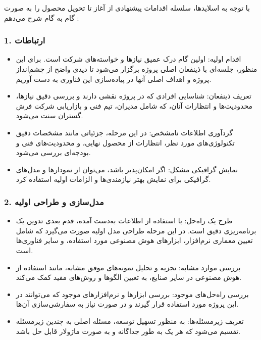 با توجه به اسلایدها، 
سلسله اقدامات پیشنهادی از آغاز تا تحویل محصول را به صورت گام به گام شرح می‌دهم
:


\subsubsection*{1. ارتباطات}
\begin{itemize}
    \item
    اقدام اولیه: اولین گام درک عمیق نیازها و خواسته‌های شرکت است. برای این منظور، جلسه‌ای با ذینفعان اصلی پروژه برگزار می‌شود تا دیدی واضح از چشم‌انداز پروژه و اهداف اصلی آنها در پیاده‌سازی این فناوری به دست آوریم.
    \item 
    تعریف ذینفعان: شناسایی افرادی که در پروژه نقشی دارند و بررسی دقیق نیازها، محدودیت‌ها و انتظارات آنان، که شامل مدیران، تیم فنی و بازاریابی شرکت فرش گستران سنت می‌شود.
    \item   
    گردآوری اطلاعات نامشخص: در این مرحله، جزئیاتی مانند مشخصات دقیق تکنولوژی‌های مورد نظر، انتظارات از محصول نهایی، و محدودیت‌های فنی و بودجه‌ای بررسی می‌شود.
    \item 
    نمایش گرافیکی مشکل: اگر امکان‌پذیر باشد، می‌توان از نمودارها و مدل‌های گرافیکی برای نمایش بهتر نیازمندی‌ها و الزامات اولیه استفاده کرد.
\end{itemize}

\subsubsection*{2. مدل‌سازی و طراحی اولیه}

\begin{itemize}
    \item 
    طرح یک راه‌حل: با استفاده از اطلاعات به‌دست آمده، قدم بعدی تدوین یک برنامه‌ریزی دقیق است. در این مرحله طراحی مدل اولیه صورت می‌گیرد که شامل تعیین معماری نرم‌افزار، ابزارهای هوش مصنوعی مورد استفاده، و سایر فناوری‌ها است.
    \item 
    بررسی موارد مشابه: تجزیه و تحلیل نمونه‌های موفق مشابه، مانند استفاده از هوش مصنوعی در سایر صنایع، به تعیین الگوها و روش‌های مفید کمک می‌کند.
    \item 
    بررسی راه‌حل‌های موجود: بررسی ابزارها و نرم‌افزارهای موجود که می‌توانند در این پروژه مورد استفاده قرار گیرند و در صورت نیاز به سفارشی‌سازی آن‌ها.
    \item 
    تعریف زیرمسئله‌ها: به منظور تسهیل توسعه، مسئله اصلی به چندین زیرمسئله تقسیم می‌شود که هر یک به طور جداگانه و به صورت ماژولار قابل حل باشد.
\end{itemize}


